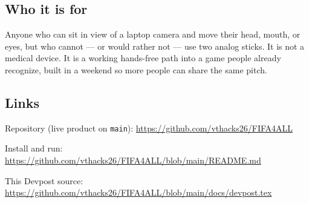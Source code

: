 \documentclass[11pt]{article}
\begin{document}
\subsection*{Who it is for}

Anyone who can sit in view of a laptop camera and move their head, mouth, or
eyes, but who cannot --- or would rather not --- use two analog sticks. It is
not a medical device. It is a working hands-free path into a game people
already recognize, built in a weekend so more people can share the same
pitch.

\subsection*{Links}

Repository (live product on \texttt{main}):
\url{https://github.com/vthacks26/FIFA4ALL}

Install and run:
\url{https://github.com/vthacks26/FIFA4ALL/blob/main/README.md}

This Devpost source:
\url{https://github.com/vthacks26/FIFA4ALL/blob/main/docs/devpost.tex}
\end{document}
